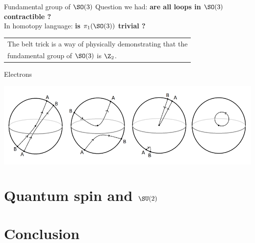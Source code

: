 \documentclass[10pt]{beamer}
\begin{document}
\begin{frame}{Fundamental group of $\SO(3)$}
  Question we had: \textbf{are all loops in $\SO(3)$ contractible ?}\\[0.3cm]

  In homotopy language: \textbf{is $\pi_1(\SO(3))$ trivial ?}

  \begin{center}
    \begin{tabular}{|l|}
        \hline
        The belt trick is a way of physically demonstrating that the \\ fundamental group of $\SO(3)$ is $\Z_2$.\\ \hline
    \end{tabular}
  \end{center}
  
\end{frame}


\begin{frame}{Electrons}
\end{frame}

\begin{frame}

    \includegraphics[scale=0.1]{Pictures/4pitxistecontractibility.png}

\end{frame}

\section{Quantum spin and $\SU(2)$}

\section{Conclusion}
\end{document}
